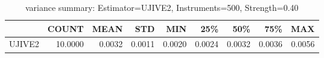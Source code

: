 \begin{table}[ht]
\centering
\caption{variance summary: Estimator=UJIVE2, Instruments=500, Strength=0.40}
\begin{tabular}{lrrrrrrrr}
\toprule
 & COUNT & MEAN & STD & MIN & 25\% & 50\% & 75\% & MAX \\
\midrule
UJIVE2 & 10.0000 & 0.0032 & 0.0011 & 0.0020 & 0.0024 & 0.0032 & 0.0036 & 0.0056 \\
\bottomrule
\end{tabular}
\end{table}
